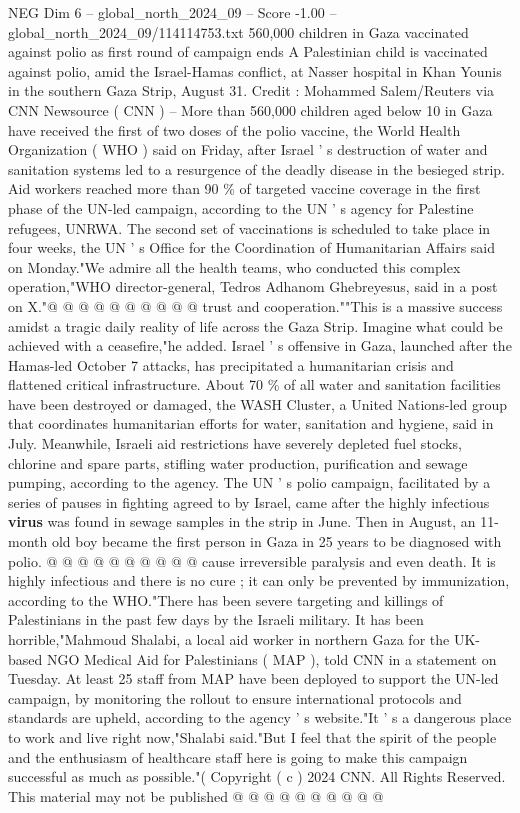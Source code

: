 \begin{textsample}{NEG Dim 6 – global\_north\_2024\_09 – Score -1.00 – global\_north\_2024\_09/114114753.txt}  \label{ex:f6_neg_092}
560,000 children in Gaza vaccinated against polio as first round of campaign ends A Palestinian child is vaccinated against polio, amid the Israel-Hamas conflict, at Nasser hospital in Khan Younis in the southern Gaza Strip, August 31.
Credit : Mohammed Salem/Reuters via CNN Newsource ( CNN ) -- More than 560,000 children aged below 10 in Gaza have received the first of two doses of the polio vaccine, the World Health Organization ( WHO ) said on Friday, after Israel ' s destruction of water and sanitation systems led to a resurgence of the deadly disease in the besieged strip.
Aid workers reached more than 90 \% of targeted vaccine coverage in the first phase of the UN-led campaign, according to the UN ' s agency for Palestine refugees, UNRWA.
The second set of vaccinations is scheduled to take place in four weeks, the UN ' s Office for the Coordination of Humanitarian Affairs said on Monday."We admire all the health teams, who conducted this complex operation,"WHO director-general, Tedros Adhanom Ghebreyesus, said in a post on X."@ @ @ @ @ @ @ @ @ @ trust and cooperation.""This is a massive success amidst a tragic daily reality of life across the Gaza Strip.
Imagine what could be achieved with a ceasefire,"he added.
Israel ' s offensive in Gaza, launched after the Hamas-led October 7 attacks, has precipitated a humanitarian crisis and flattened critical infrastructure.
About 70 \% of all water and sanitation facilities have been destroyed or damaged, the WASH Cluster, a United Nations-led group that coordinates humanitarian efforts for water, sanitation and hygiene, said in July.
Meanwhile, Israeli aid restrictions have severely depleted fuel stocks, chlorine and spare parts, stifling water production, purification and sewage pumping, according to the agency.
The UN ' s polio campaign, facilitated by a series of pauses in fighting agreed to by Israel, came after the highly infectious \textbf{virus} was found in sewage samples in the strip in June.
Then in August, an 11-month old boy became the first person in Gaza in 25 years to be diagnosed with polio. @ @ @ @ @ @ @ @ @ @ cause irreversible paralysis and even death.
It is highly infectious and there is no cure ; it can only be prevented by immunization, according to the WHO."There has been severe targeting and killings of Palestinians in the past few days by the Israeli military.
It has been horrible,"Mahmoud Shalabi, a local aid worker in northern Gaza for the UK-based NGO Medical Aid for Palestinians ( MAP ), told CNN in a statement on Tuesday.
At least 25 staff from MAP have been deployed to support the UN-led campaign, by monitoring the rollout to ensure international protocols and standards are upheld, according to the agency ' s website."It ' s a dangerous place to work and live right now,"Shalabi said."But I feel that the spirit of the people and the enthusiasm of healthcare staff here is going to make this campaign successful as much as possible."( Copyright ( c ) 2024 CNN.
All Rights Reserved.
This material may not be published @ @ @ @ @ @ @ @ @ @

\end{textsample}
